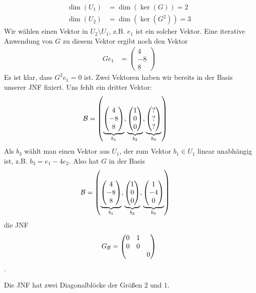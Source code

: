\begin{bspe}
\begin{enumerate}
\begin{align*}
			\dim(U_1) &= \dim(\ker(G)) = 2 \\
			\dim(U_2) &= \dim(\ker(G^2)) = 3
		\end{align*}
		Wir wählen einen Vektor in $ U_2 \setminus U_1 $, z.B. $ e_1 $ ist ein solcher Vektor. Eine iterative Anwendung von $G$ zu diesem Vektor ergibt noch den Vektor
		\begin{align*}
			G e_1 &= \begin{pmatrix}
				4 \\ -8 \\ 8
			\end{pmatrix} 
		\end{align*}
		Es ist klar, dass $G^2 e_1 = 0$ ist. Zwei Vektoren haben wir bereits in der Basis unserer JNF fixiert. Uns fehlt ein dritter Vektor: 
		\begin{align*}
			\mathcal{B} &= \left( \underbrace{\begin{pmatrix}
					4 \\ -8 \\ 8
			\end{pmatrix}}_{b_1}, \underbrace{\begin{pmatrix}
					1 \\ 0 \\ 0
			\end{pmatrix}}_{b_2}, \underbrace{\begin{pmatrix}
					? \\ ? \\ ?
			\end{pmatrix}}_{b_3} \right)
		\end{align*}
		Als $ b_3 $ wählt man einen Vektor aus $ U_1 $, der zum Vektor $ b_1 \in U_1 $ linear unabhängig ist, z.B. $ b_3 = e_1 - 4e_2 $. Also hat $G$ in der Basis
		\begin{align*}
			\mathcal{B} &= \left( \underbrace{\begin{pmatrix}
					4 \\ -8 \\ 8
			\end{pmatrix}}_{b_1}, \underbrace{\begin{pmatrix}
					1 \\ 0 \\ 0
			\end{pmatrix}}_{b_2}, \underbrace{\begin{pmatrix}
					1 \\ -4 \\ 0
			\end{pmatrix}}_{b_3} \right)
		\end{align*}
		die JNF 
		\begin{equation*}
			G_{\mathcal{B}} = \begin{pmatrix}
				0 & 1 & \\
				0 & 0 & \\
				&& 0
			\end{pmatrix}
		\end{equation*}.
	\end{enumerate}
	Die JNF hat zwei Diagonalblöcke der Größen $2$ und $1$. 
\end{bspe}

